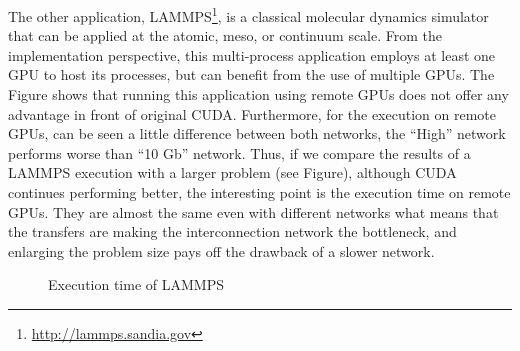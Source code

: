 \documentclass[a4paper,twoside]{article}
\begin{document}
The other application, LAMMPS\footnote{\url{http://lammps.sandia.gov}}, is a classical molecular dynamics simulator that can be applied at the atomic, meso, or continuum scale. 
From the implementation perspective, this multi-process application employs at least one GPU to host its processes, but can benefit from the use of multiple GPUs.
The Figure shows that running this application using remote GPUs does not offer any advantage in front of original CUDA. 
Furthermore, for the execution on remote GPUs, can be seen a little difference between both networks, the ``High'' network performs worse than ``10 Gb'' network.
Thus, if we compare the results of a LAMMPS execution with a larger problem (see Figure), although CUDA continues performing better, the interesting point is the execution time on remote GPUs. 
They are almost the same even with different networks what means that the transfers are making the interconnection network the bottleneck, and enlarging the problem size
pays off the drawback of a slower network.

\begin{figure}[htb]
\centering
{}
\quad
{}
\caption{Execution time of LAMMPS}
\label{fig:lammps}
\end{figure}
\end{document}
